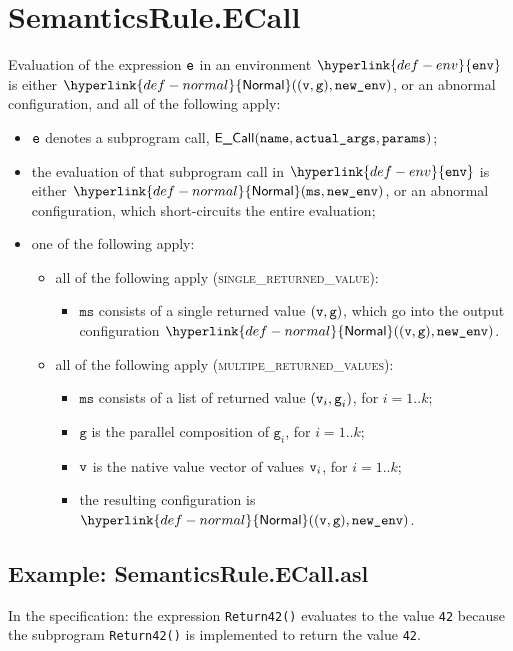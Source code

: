 \documentclass{book}
\newcommand\Normal[0]{\hyperlink{def-normal}{\textsf{Normal}}}
\newcommand\env[0]{\hyperlink{def-env}{\texttt{env}}}
\newcommand\vg[0]{\texttt{g}}
\newcommand\vms[0]{\texttt{ms}}
\newcommand\name[0]{\texttt{name}}
\newcommand\actualargs[0]{\texttt{actual\_args}}
\newcommand\params[0]{\texttt{params}}
\begin{document}
\section{SemanticsRule.ECall \label{sec:SemanticsRule.ECall}}
  Evaluation of the expression $\texttt{e}$ in an environment $\env$ is either $\Normal((\vv, \vg), \newenv)$,
  or an abnormal configuration, and all of the following apply:
  \begin{itemize}
    \item $\texttt{e}$ denotes a subprogram call, $\ECall(\name, \actualargs, \params)$;
    \item the evaluation of that subprogram call in $\env$ is either
    $\Normal(\vms, \newenv)$, or an abnormal configuration,
    which short-circuits the entire evaluation;
    \item one of the following apply:
    \begin{itemize}
      \item all of the following apply (\textsc{single\_returned\_value}):
      \begin{itemize}
        \item $\vms$ consists of a single returned value $(\vv,\vg)$,
        which go into the output configuration $\Normal((\vv, \vg), \newenv)$.
      \end{itemize}

      \item all of the following apply (\textsc{multipe\_returned\_values}):
      \begin{itemize}
        \item $\vms$ consists of a list of returned value $(\vv_i,\vg_i)$, for $i=1..k$;
        \item $\vg$ is the parallel composition of $\vg_i$, for $i=1..k$;
        \item $\texttt{v}$ is the native value vector of values $\texttt{v}_i$, for $i=1..k$;
        \item the resulting configuration is $\Normal((\vv, \vg), \newenv)$.
      \end{itemize}
    \end{itemize}
  \end{itemize}

  \subsection{Example: SemanticsRule.ECall.asl}
    In the specification:
    the expression \texttt{Return42()} evaluates to the value \texttt{42} because the
    subprogram \texttt{Return42()} is implemented to return the value \texttt{42}.
\end{document}
